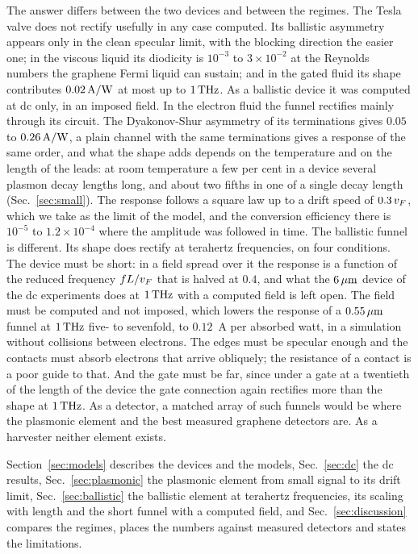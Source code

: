 The answer differs between the two devices and between the regimes. The
Tesla valve does not rectify usefully in any case computed. Its ballistic
asymmetry appears only in the clean specular limit, with the blocking
direction the easier one; in the viscous liquid its diodicity is
$10^{-3}$ to $3\times10^{-2}$ at the Reynolds numbers the graphene Fermi
liquid can sustain; and in the gated fluid its shape contributes
$0.02\,\mathrm{A/W}$ at most up to $1\,\mathrm{THz}$. As a ballistic device it was computed at
dc only, in an imposed field. In the electron fluid the funnel rectifies
mainly through its circuit. The Dyakonov-Shur asymmetry of its
terminations gives $0.05$ to $0.26\,\mathrm{A/W}$, a plain channel with the same
terminations gives a response of the same order, and what the shape adds
depends on the temperature and on the length of the leads: at room
temperature a few per cent in a device several plasmon decay lengths
long, and about two fifths in one of a single decay length
(Sec.~\ref{sec:small}). The response follows a square law up to a drift
speed of $0.3\,v_{F}$, which we take as the limit of the model, and the
conversion efficiency there is $10^{-5}$ to $1.2\times10^{-4}$ where the
amplitude was followed in time. The ballistic funnel is different. Its
shape does rectify at terahertz frequencies, on four conditions. The
device must be short: in a field spread over it the response is a
function of the reduced frequency $fL/v_{F}$ that is halved at $0.4$, and
what the $6\,\mu\mathrm{m}$ device of the dc experiments does at $1\,\mathrm{THz}$ with a
computed field is left open. The field must be computed and not imposed,
which lowers the response of a $0.55\,\mu\mathrm{m}$ funnel at $1\,\mathrm{THz}$ five- to
sevenfold, to $0.12$~A per absorbed watt, in a simulation without
collisions between electrons. The edges must be specular enough and the
contacts must absorb electrons that arrive obliquely; the resistance of a
contact is a poor guide to that. And the gate must be far, since under a
gate at a twentieth of the length of the device the gate connection again
rectifies more than the shape at $1\,\mathrm{THz}$. As a detector, a matched array
of such funnels would be where the plasmonic element and the best
measured graphene detectors are. As a harvester neither element exists.

Section~\ref{sec:models} describes the devices and the models,
Sec.~\ref{sec:dc} the dc results, Sec.~\ref{sec:plasmonic} the plasmonic
element from small signal to its drift limit, Sec.~\ref{sec:ballistic} the
ballistic element at terahertz frequencies, its scaling with length and
the short funnel with a computed field, and
Sec.~\ref{sec:discussion} compares the regimes, places the numbers against
measured detectors and states the limitations.

